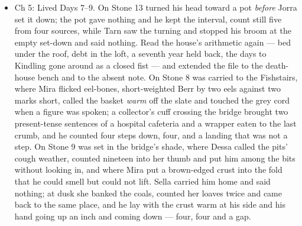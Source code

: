 \documentclass{design/chronicle}
\begin{document}
{\begin{itemize}[leftmargin=1.4em,itemsep=1pt,topsep=3pt,parsep=0pt]
\item Ch 5: Lived Days 7--9. On Stone 13 turned his head toward a pot \emph{before} Jorra set it down; the pot gave nothing and he kept the interval, count still five from four sources, while Tarn saw the turning and stopped his broom at the empty set-down and said nothing. Read the house’s arithmetic again --- bed under the roof, debt in the loft, a seventh year held back, the days to Kindling gone around as a closed fist --- and extended the file to the death-house bench and to the absent note. On Stone 8 was carried to the Fishstairs, where Mira flicked eel-bones, short-weighted Berr by two eels against two marks short, called the basket \emph{warm} off the slate and touched the grey cord when a figure was spoken; a collector’s cuff crossing the bridge brought two present-tense sentences of a hospital cafeteria and a wrapper eaten to the last crumb, and he counted four steps down, four, and a landing that was not a step. On Stone 9 was set in the bridge’s shade, where Dessa called the pits’ cough weather, counted nineteen into her thumb and put him among the bits without looking in, and where Mira put a brown-edged crust into the fold that he could smell but could not lift. Sella carried him home and said nothing; at dusk she banked the coals, counted her loaves twice and came back to the same place, and he lay with the crust warm at his side and his hand going up an inch and coming down --- four, four and a gap.

\end{itemize}

\begin{itemize}[leftmargin=1.4em,itemsep=1pt,topsep=3pt,parsep=0pt]


\end{itemize}}
\end{document}
